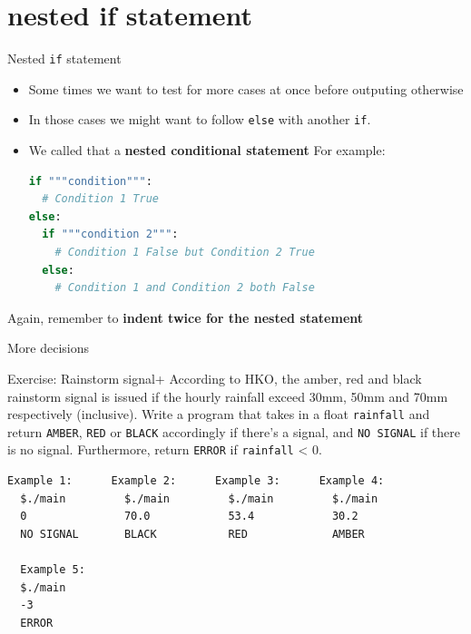 \documentclass[10pt,xcolor={table,dvipsnames},t]{beamer}
\begin{document}
\section{nested if statement}
\begin{frame}[fragile]{Nested \texttt{if} statement}
  \begin{itemize}
    \item Some times we want to test for more cases at once before outputing otherwise
    \item In those cases we might want to follow \texttt{else} with another \texttt{if}. 
    \item We called that a \textbf{nested conditional statement} For example:
\begin{lstlisting}[language=python]
if """condition""":
  # Condition 1 True 
else:
  if """condition 2""":
    # Condition 1 False but Condition 2 True
  else:
    # Condition 1 and Condition 2 both False
\end{lstlisting}
  \end{itemize}
  Again, remember to \textbf{indent twice for the nested statement}
\end{frame}

\begin{frame}[fragile]{More decisions}
  \begin{exampleblock}{Exercise: Rainstorm signal+}
    According to HKO, the amber, red and black rainstorm signal is issued if the hourly rainfall exceed 30mm, 50mm and 70mm respectively (inclusive). Write a program that takes in a float \texttt{rainfall} and return \texttt{AMBER}, \texttt{RED} or \texttt{BLACK} accordingly if there's a signal, and \texttt{NO SIGNAL} if there is no signal. Furthermore, return \texttt{ERROR} if \texttt{rainfall} < 0.
  \end{exampleblock}
\begin{lstlisting}[language=bash]
  Example 1:      Example 2:      Example 3:      Example 4:
  $./main         $./main         $./main         $./main
  0               70.0            53.4            30.2
  NO SIGNAL       BLACK           RED             AMBER

  Example 5:
  $./main
  -3
  ERROR
\end{lstlisting}
\end{frame}
\end{document}
